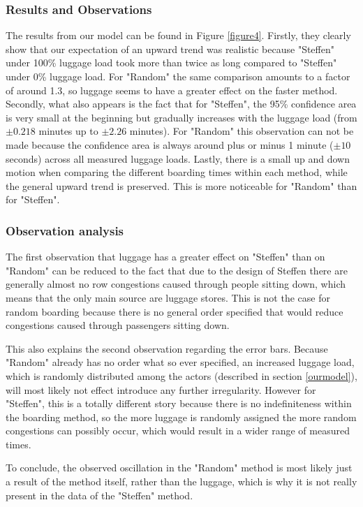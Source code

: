 \documentclass[11pt]{article}
\begin{document}
	\subsubsection{Results and Observations}
	The results from our model can be found in Figure \ref{figure4}. Firstly, they clearly show that our expectation of an upward trend was realistic because "Steffen" under 100\% luggage load took more than twice as long compared to "Steffen" under 0\% luggage load. For "Random" the same comparison amounts to a factor of around 1.3, so luggage seems to have a greater effect on the faster method. Secondly, what also appears is the fact that for "Steffen", the 95\% confidence area is very small at the beginning but gradually increases with the luggage load (from $\pm 0.218$ minutes up to $\pm 2.26$ minutes). For "Random" this observation can not be made because the confidence area is always around plus or minus 1 minute ($\pm 10$ seconds) across all measured luggage loads. Lastly, there is a small up and down motion when comparing the different boarding times within each method, while the general upward trend is preserved. This is more noticeable for "Random" than for "Steffen". 
	
	\subsubsection{Observation analysis}
		The first observation that luggage has a greater effect on "Steffen" than on "Random" can be reduced to the fact that due to the design of Steffen there are generally almost no row congestions caused through people sitting down, which means that the only main source are luggage stores. This is not the case for random boarding because there is no general order specified that would reduce congestions caused through passengers sitting down. 
		
		This also explains the second observation regarding the error bars. Because "Random" already has no order what so ever specified, an increased luggage load, which is randomly distributed among the actors (described in section \ref{ourmodel}), will most likely not effect introduce any further irregularity. However for "Steffen", this is a totally different story because there is no indefiniteness within the boarding method, so the more luggage is randomly assigned the more random congestions can possibly occur, which would result in a wider range of measured times.
		
		To conclude, the observed oscillation in the "Random" method is most likely just a result of the method itself, rather than the luggage, which is why it is not really present in the data of the "Steffen" method.
	
\end{document}
